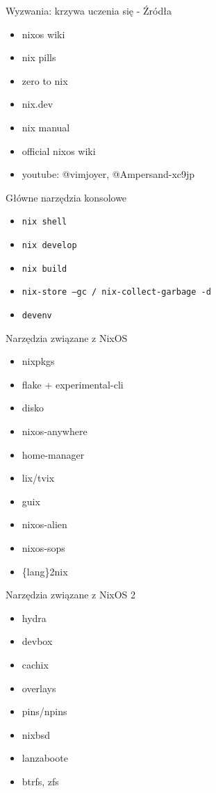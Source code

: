 \documentclass{beamer}
\begin{document}
\begin{frame}{Wyzwania: krzywa uczenia się - Źródła}
    \begin{itemize}
        \item nixos wiki
        \item nix pills
        \item zero to nix
        \item nix.dev
        \item nix manual
        \item official nixos wiki
        \item youtube: @vimjoyer, @Ampersand-xc9jp
    \end{itemize}
\end{frame}

\begin{frame}{Główne narzędzia konsolowe}
    \begin{itemize}
        \item \texttt{nix shell}
        \item \texttt{nix develop}
        \item \texttt{nix build}
        \item \texttt{nix-store --gc / nix-collect-garbage -d}
        \item \texttt{devenv}
    \end{itemize}
\end{frame}

\begin{frame}{Narzędzia związane z NixOS}
    \begin{itemize}
        \item nixpkgs
        \item flake + experimental-cli
        \item disko
        \item nixos-anywhere
        \item home-manager
        \item lix/tvix
        \item guix
        \item nixos-alien
        \item nixos-sops
        \item \{lang\}2nix
    \end{itemize}
\end{frame}

\begin{frame}{Narzędzia związane z NixOS 2}
    \begin{itemize}
        \item hydra
        \item devbox
        \item cachix
        \item overlays
        \item pins/npins
        \item nixbsd
        \item lanzaboote
        \item btrfs, zfs
    \end{itemize}
\end{frame}
\end{document}
